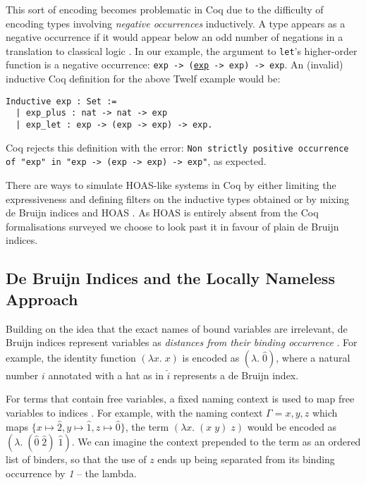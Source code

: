 \documentclass[]{unswthesis}
\let\c\texttt
\let\i\textit
\begin{document}
This sort of encoding becomes problematic in Coq due to the difficulty of encoding types involving \i{negative occurrences} inductively. A type appears as a negative occurrence if it would appear below an odd number of negations in a translation to classical logic \cite{tapl}. In our example, the argument to \c{let}'s higher-order function is a negative occurrence: \c{exp -> (\underline{exp} -> exp) -> exp}. An (invalid) inductive Coq definition for the above Twelf example would be:

\begin{verbatim}
Inductive exp : Set :=
  | exp_plus : nat -> nat -> exp
  | exp_let : exp -> (exp -> exp) -> exp.
\end{verbatim}

Coq rejects this definition with the error: \c{Non strictly positive occurrence of "exp" in
 "exp -> (exp -> exp) -> exp"}, as expected.

There are ways to simulate HOAS-like systems in Coq by either limiting the expressiveness and defining filters on the inductive types obtained \cite{despeyroux95} or by mixing de Bruijn indices and HOAS \cite{capretta07}. As HOAS is entirely absent from the Coq formalisations surveyed we choose to look past it in favour of plain de Bruijn indices.

\subsection{De Bruijn Indices and the Locally Nameless Approach}
\label{sec:de_bruijn}

Building on the idea that the exact names of bound variables are irrelevant, de Bruijn indices represent variables as \i{distances from their binding occurrence} \cite{deBruijn72}. For example, the identity function $(\lambda x. \; x)$ is encoded as $(\lambda . \; \hat{0})$, where a natural number $i$ annotated with a hat as in $\hat{i}$ represents a de Bruijn index.

For terms that contain free variables, a fixed naming context is used to map free variables to indices \cite{tapl}. For example, with the naming context $\Gamma = x, y, z$ which maps $\{x \mapsto \hat{2}, y \mapsto \hat{1}, z \mapsto \hat{0}\}$, the term $(\lambda x. \; (x \; y) \; z)$ would be encoded as $(\lambda. \; (\hat{0} \; \hat{2}) \; \hat{1})$. We can imagine the context prepended to the term as an ordered list of binders, so that the use of $z$ ends up being separated from its binding occurrence by \i{1} -- the lambda.
\end{document}
